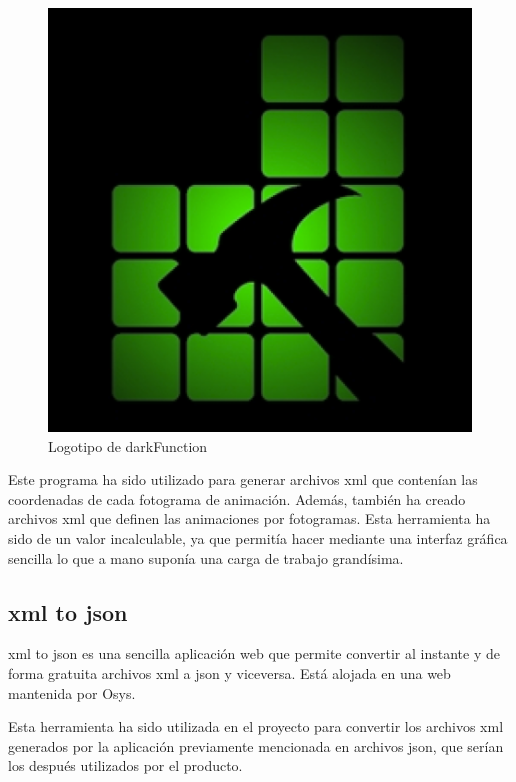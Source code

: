 		\begin{figure}[!htp]
			 \centering
			 \includegraphics[scale=.25]{fig/darkF}
			 \caption{Logotipo de darkFunction}
			 \label{fig:darkF}
		\end{figure}

		\FloatBarrier

		Este programa ha sido utilizado para generar archivos \acrshort{xml} que contenían las coordenadas de cada fotograma de animación. Además, también ha creado archivos \acrshort{xml} que definen las animaciones por fotogramas. Esta herramienta ha sido de un valor incalculable, ya que permitía hacer mediante una interfaz gráfica sencilla lo que a mano suponía una carga de trabajo grandísima.

	\subsection{\acrshort{xml} to \acrshort{json}}

		\acrshort{xml} to \acrshort{json} es una sencilla aplicación web que permite convertir al instante y de forma gratuita archivos \acrshort{xml} a \acrshort{json} y viceversa. Está alojada en una web mantenida por Osys.

		Esta herramienta ha sido utilizada en el proyecto para convertir los archivos \acrshort{xml} generados por la aplicación previamente mencionada en archivos \acrshort{json}, que serían los después utilizados por el producto.

